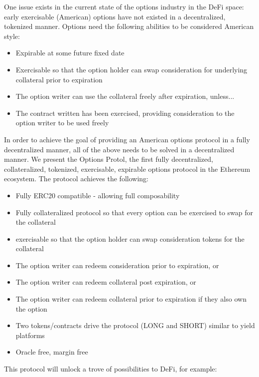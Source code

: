 One issue exists in the current state of the options industry in the DeFi space: early exercisable (American) options have not existed in a decentralized, tokenized manner.
Options need the following abilities to be considered American style:
\begin{itemize}
  \setlength{\itemsep}{0pt}
  \setlength{\parskip}{0pt}
  \item Expirable at some future fixed date
  \item Exercisable so that the option holder can swap consideration for underlying collateral prior to expiration
  \item The option writer can use the collateral freely after expiration, unless...
  \item The contract written has been exercised, providing consideration to the option writer to be used freely
\end{itemize}

In order to achieve the goal of providing an American options protocol in a fully decentralized manner, all of the above needs to be solved in a decentralized manner.
We present the \greekfi Options Protol, the first fully decentralized, collateralized, tokenized, exercisable, expirable options protocol in the Ethereum ecosystem.
The protocol achieves the following:
\begin{itemize}
  \setlength{\itemsep}{0pt}
  \setlength{\parskip}{0pt}
  \item Fully ERC20 compatible - allowing full composability
  \item Fully collateralized protocol so that every option can be exercised to swap for the collateral
  \item exercisable so that the option holder can swap consideration tokens for the collateral
  \item The option writer can redeem consideration prior to expiration, or
  \item The option writer can redeem collateral post expiration, or
  \item The option writer can redeem collateral prior to expiration if they also own the option
  \item Two tokens/contracts drive the protocol (LONG and SHORT) similar to yield platforms
  \item Oracle free, margin free
\end{itemize}

This protocol will unlock a trove of possibilities to DeFi, for example:

